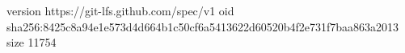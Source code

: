 version https://git-lfs.github.com/spec/v1
oid sha256:8425c8a94e1e573d4d664b1c50cf6a5413622d60520b4f2e731f7baa863a2013
size 11754
